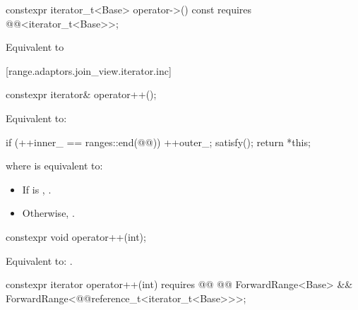 {{
\begin{itemdecl}
constexpr iterator_t<Base> operator->() const
  requires @@<iterator_t<Base>>;
\end{itemdecl}

\begin{itemdescr}
\pnum
\effects Equivalent to 
\end{itemdescr}
} %

[range.adaptors.join_view.iterator.inc]{}

\begin{itemdecl}
constexpr iterator& operator++();
\end{itemdecl}

\begin{itemdescr}
\pnum
\effects Equivalent to:
\begin{codeblock}
if (++inner_ == ranges::end(@@)) {
  ++outer_;
  satisfy();
}
return *this;
\end{codeblock}

where  is equivalent to:
\begin{itemize}
\item If  is , .
\item Otherwise, .
\end{itemize}
\end{itemdescr}

\begin{itemdecl}
constexpr void operator++(int);
\end{itemdecl}

\begin{itemdescr}
\pnum
\effects Equivalent to: .
\end{itemdescr}

\begin{itemdecl}
constexpr iterator operator++(int)
  requires @@
    @@ ForwardRange<Base> &&
    ForwardRange<@@reference_t<iterator_t<Base>>>;
\end{itemdecl}

}
